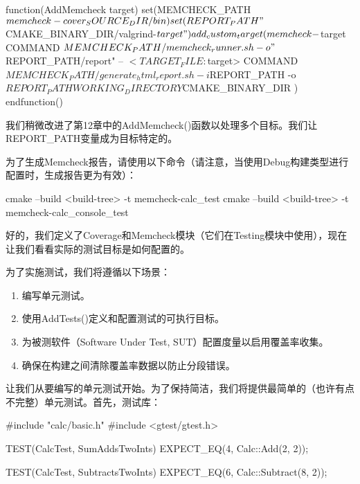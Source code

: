 \begin{cmake}
function(AddMemcheck target)
    set(MEMCHECK_PATH ${memcheck-cover_SOURCE_DIR}/bin)
    set(REPORT_PATH "${CMAKE_BINARY_DIR}/valgrind-${target}")
    add_custom_target(memcheck-${target}
        COMMAND ${MEMCHECK_PATH}/memcheck_runner.sh -o
            "${REPORT_PATH}/report"
            -- $<TARGET_FILE:${target}>
        COMMAND ${MEMCHECK_PATH}/generate_html_report.sh
            -i ${REPORT_PATH}
            -o ${REPORT_PATH}
        WORKING_DIRECTORY ${CMAKE_BINARY_DIR}
    )
endfunction()
\end{cmake}

我们稍微改进了第12章中的AddMemcheck()函数以处理多个目标。我们让REPORT\_PATH变量成为目标特定的。

为了生成Memcheck报告，请使用以下命令（请注意，当使用Debug构建类型进行配置时，生成报告更为有效）：

\begin{shell}
cmake --build <build-tree> -t memcheck-calc_test
cmake --build <build-tree> -t memcheck-calc_console_test
\end{shell}

好的，我们定义了Coverage和Memcheck模块（它们在Testing模块中使用），现在让我们看看实际的测试目标是如何配置的。


为了实施测试，我们将遵循以下场景：

\begin{enumerate}
\item
编写单元测试。

\item
使用AddTests()定义和配置测试的可执行目标。

\item
为被测软件（Software Under Test, SUT）配置度量以启用覆盖率收集。

\item
确保在构建之间清除覆盖率数据以防止分段错误。
\end{enumerate}

让我们从要编写的单元测试开始。为了保持简洁，我们将提供最简单的（也许有点不完整）单元测试。首先，测试库：


\begin{cmake}
#include "calc/basic.h"
#include <gtest/gtest.h>

TEST(CalcTest, SumAddsTwoInts) {
    EXPECT_EQ(4, Calc::Add(2, 2));
}

TEST(CalcTest, SubtractsTwoInts) {
    EXPECT_EQ(6, Calc::Subtract(8, 2));
}
\end{cmake}

